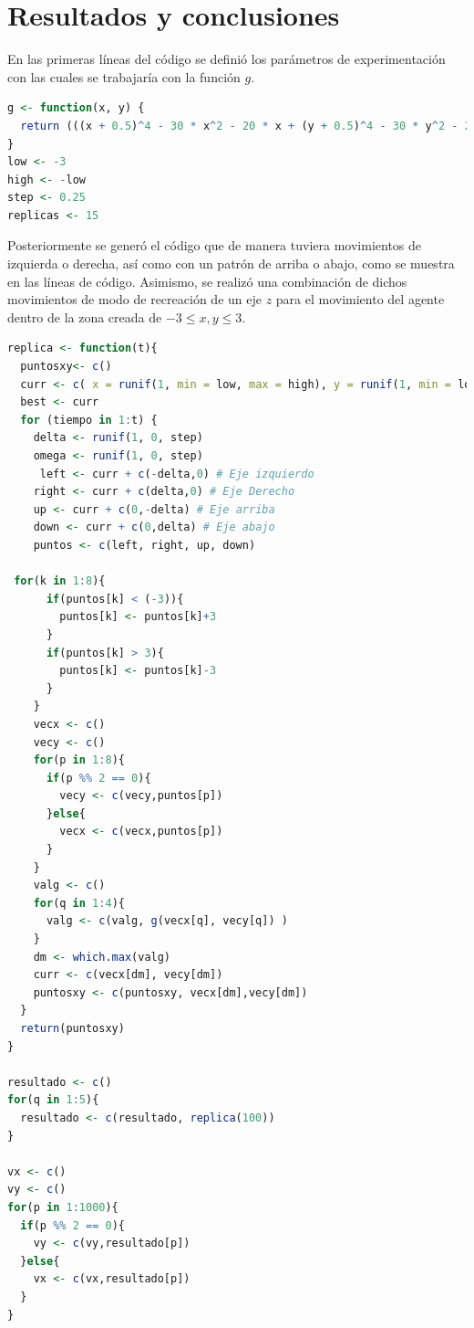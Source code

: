 \documentclass[12pt, letterpaper] {article}
\begin{document}
\section{Resultados y conclusiones}

En las primeras líneas del c\'odigo se defini\'o los par\'ametros de experimentaci\'on con las cuales se trabajar\'ia con la funci\'on $g$.

\begin{lstlisting}[language=R]
g <- function(x, y) {
  return (((x + 0.5)^4 - 30 * x^2 - 20 * x + (y + 0.5)^4 - 30 * y^2 - 20 * y)/100)
}
low <- -3
high <- -low
step <- 0.25
replicas <- 15
\end{lstlisting}

Posteriormente se gener\'o el c\'odigo que de manera tuviera movimientos de izquierda o derecha, as\'i como con un patr\'on de arriba o abajo, como se muestra en las líneas de c\'odigo. Asimismo, se realizó una combinación de dichos movimientos de modo de recreación de un eje $z$ para el movimiento del agente dentro de la zona creada de $-3 \leq x, y \leq 3$.

\begin{lstlisting}[language=R]
replica <- function(t){
  puntosxy<- c()
  curr <- c( x = runif(1, min = low, max = high), y = runif(1, min = low, max = high))
  best <- curr
  for (tiempo in 1:t) {
    delta <- runif(1, 0, step)
    omega <- runif(1, 0, step)
     left <- curr + c(-delta,0) # Eje izquierdo
    right <- curr + c(delta,0) # Eje Derecho
    up <- curr + c(0,-delta) # Eje arriba
    down <- curr + c(0,delta) # Eje abajo
    puntos <- c(left, right, up, down)

 for(k in 1:8){
      if(puntos[k] < (-3)){
        puntos[k] <- puntos[k]+3 
      }
      if(puntos[k] > 3){
        puntos[k] <- puntos[k]-3
      }
    }
    vecx <- c()
    vecy <- c()
    for(p in 1:8){
      if(p %% 2 == 0){
        vecy <- c(vecy,puntos[p])
      }else{
        vecx <- c(vecx,puntos[p])
      }
    }
    valg <- c()
    for(q in 1:4){
      valg <- c(valg, g(vecx[q], vecy[q]) )
    }
    dm <- which.max(valg)
    curr <- c(vecx[dm], vecy[dm])
    puntosxy <- c(puntosxy, vecx[dm],vecy[dm])
  }
  return(puntosxy)
}

resultado <- c()
for(q in 1:5){
  resultado <- c(resultado, replica(100))
}

vx <- c()
vy <- c()
for(p in 1:1000){
  if(p %% 2 == 0){
    vy <- c(vy,resultado[p])
  }else{
    vx <- c(vx,resultado[p])
  }
}   
\end{lstlisting}
\end{document}
